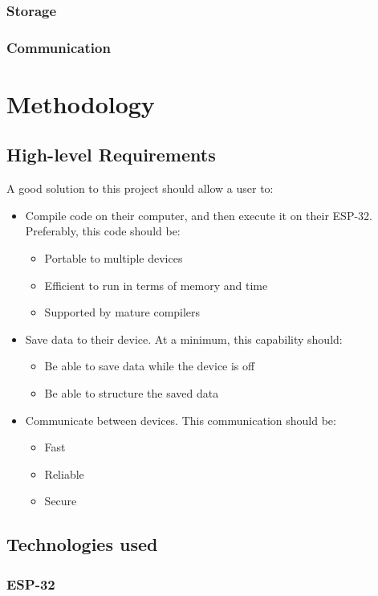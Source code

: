 \documentclass{article}
\begin{document}
\subsubsection{Storage}
\subsubsection{Communication}

\section{Methodology}
\subsection{High-level Requirements}
A good solution to this project should allow a user to:
\begin{itemize}
\item Compile code on their computer, and then execute it on their ESP-32. Preferably, this code should be:
\begin{itemize}
  \item Portable to multiple devices
  \item Efficient to run in terms of memory and time
  \item Supported by mature compilers
\end{itemize}
\item Save data to their device. At a minimum, this capability should:
\begin{itemize}
  \item Be able to save data while the device is off
  \item Be able to structure the saved data
\end{itemize}
\item Communicate between devices. This communication should be:
\begin{itemize}
  \item Fast
  \item Reliable
  \item Secure
\end{itemize}
\end{itemize}
\subsection{Technologies used}
\subsubsection{ESP-32}
\end{document}

